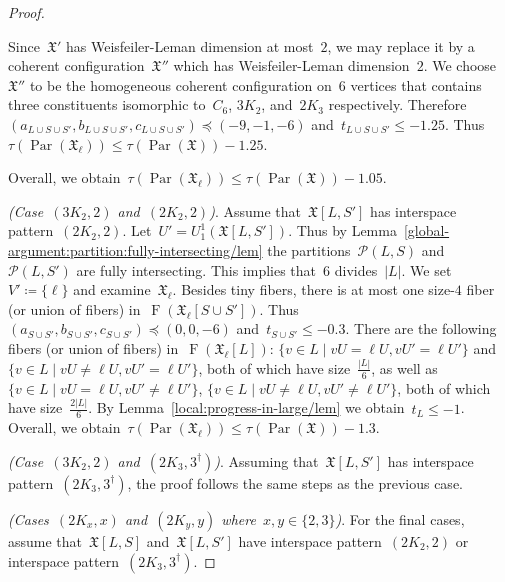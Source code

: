 \documentclass[english,a4paper]{article}
\theoremstyle{plain}
\theoremstyle{definition}
\newcommand{\abs}[1]{| #1 |}
\DeclareMathOperator{\Fibers}{F}
\newcommand{\coherentConfig}{\ensuremath{\mathfrak{X}}}
\newcommand{\fibers}[1]{\ensuremath{\Fibers \left( #1 \right)}}
\newcommand{\interspace}[2]{\ensuremath{\coherentConfig[#1,#2]}}
\newcommand{\equivalenceClasses}[1]{\ensuremath{\mathcal{P}(#1)}}
\DeclareMathOperator{\parameters}{Par}
\newcommand{\ipfourMatching}{\ensuremath{(\disjointCliques{2}{2},2)}}
\newcommand{\ipsixMatching}             {\ensuremath{(\disjointCliques{3}{2},2)}}
\newcommand{\ipsixTriangle}               {\ensuremath{(\disjointCliques{2}{3},3^\dag)}}
\newcommand{\clique}[1]{\ensuremath{K_{#1}}}
\newcommand{\cycle}[1]{\ensuremath{C_{#1}}}
\newcommand{\disjointCliques}[2]{\ensuremath{#1 \clique{#2}}}
\begin{document}
\begin{proof}
\begin{itemize}
        Since~$\coherentConfig'$ has Weisfeiler-Leman dimension at most~$2$, we may replace it by a coherent configuration~$\coherentConfig''$ which has Weisfeiler-Leman dimension~$2$.
        We choose~$\coherentConfig''$ to be the homogeneous coherent configuration on~$6$ vertices that contains three constituents isomorphic to~$\cycle{6}$, $\disjointCliques{3}{2}$, and~$\disjointCliques{2}{3}$ respectively.
        Therefore~$(a_{L\cup S \cup S'},b_{L\cup S \cup S'},c_{L\cup S \cup S'}) \preceq (-9,-1,-6)$ and~$t_{L\cup S \cup S'} \leq -1.25$.
        Thus~$\tau(\parameters(\coherentConfig_\ell)) \leq \tau(\parameters(\coherentConfig))- 1.25$.
    \end{itemize}

    Overall, we obtain~$\tau(\parameters(\coherentConfig_\ell)) \leq \tau(\parameters(\coherentConfig))- 1.05$.


    \textit{(Case~$\ipsixMatching$ and~$\ipfourMatching$)}.
    Assume that~$\interspace{L}{S'}$ has interspace pattern~$\ipfourMatching$.
    Let~$U' = U^1_1(\interspace{L}{S'})$.
    Thus by Lemma~\ref{global-argument:partition:fully-intersecting/lem} the partitions~$\equivalenceClasses{L,S}$ and~$\equivalenceClasses{L,S'}$ are fully intersecting.
    This implies that~$6$ divides~$|L|$.
    We set~$V' \coloneqq \{\ell\}$ and examine~$\coherentConfig_\ell$.
    Besides tiny fibers, there is at most one size-$4$ fiber (or union of fibers) in~$\fibers{\coherentConfig_\ell[S \cup S']}$.
    Thus~$(a_{S \cup S'},b_{S \cup S'}, c_{S \cup S'}) \preceq (0,0,-6)$ and~$t_{S \cup S'} \leq - 0.3$.
    There are the following fibers (or union of fibers) in~$\fibers{\coherentConfig_\ell[L]}$:
    $\{ v \in L \mid vU =    \ell U,  vU' =    \ell U' \}$ and
    $\{ v \in L \mid vU \neq \ell U,  vU' =    \ell U' \}$, both of which have size~$\frac{\abs{L}}{6}$, as well as
    $\{ v \in L \mid vU =    \ell U,  vU' \neq \ell U' \}$,
    $\{ v \in L \mid vU \neq \ell U,  vU' \neq \ell U' \}$, both of which have size~$\frac{2\abs{L}}{6}$.
    By Lemma~\ref{local:progress-in-large/lem} we obtain~$t_L \leq -1$.
    Overall, we obtain~$\tau(\parameters(\coherentConfig_\ell)) \leq \tau(\parameters(\coherentConfig))- 1.3$.


    \textit{(Case~$\ipsixMatching$ and~$\ipsixTriangle$)}.
    Assuming that~$\interspace{L}{S'}$ has interspace pattern~$\ipsixTriangle$, the proof follows the same steps as the previous case.


    \textit{(Cases~$(2K_x,x)$ and~$(2K_y,y)$ where~$x,y \in \{2,3\}$)}.
    For the final cases, assume that~$\interspace{L}{S}$ and~$\interspace{L}{S'}$ have interspace pattern~$\ipfourMatching$ or interspace pattern~$\ipsixTriangle$.


\end{proof}
\end{document}
